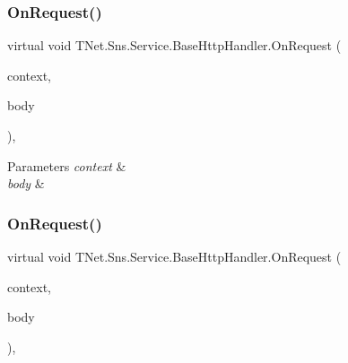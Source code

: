 \subsubsection{\texorpdfstring{On\+Request()}{OnRequest()}\hspace{0.1cm}{\footnotesize\ttfamily [1/2]}}
{\footnotesize\ttfamily virtual void T\+Net.\+Sns.\+Service.\+Base\+Http\+Handler.\+On\+Request (\begin{DoxyParamCaption}\item[{I\+Http\+Request\+Context}]{context,  }\item[{\mbox{\hyperlink{class_t_net_1_1_sns_1_1_service_1_1_response_body}{Response\+Body}}}]{body }\end{DoxyParamCaption})\hspace{0.3cm}{\ttfamily [protected]}, {\ttfamily [virtual]}}






\begin{DoxyParams}{Parameters}
{\em context} & \\
\hline
{\em body} & \\
\hline
\end{DoxyParams}
\mbox{\label{class_t_net_1_1_sns_1_1_service_1_1_base_http_handler_ad9df58a935f69c481e0b7e2e7b20900b}} 
\subsubsection{\texorpdfstring{On\+Request()}{OnRequest()}\hspace{0.1cm}{\footnotesize\ttfamily [2/2]}}
{\footnotesize\ttfamily virtual void T\+Net.\+Sns.\+Service.\+Base\+Http\+Handler.\+On\+Request (\begin{DoxyParamCaption}\item[{Http\+Context}]{context,  }\item[{\mbox{\hyperlink{class_t_net_1_1_sns_1_1_service_1_1_response_body}{Response\+Body}}}]{body }\end{DoxyParamCaption})\hspace{0.3cm}{\ttfamily [protected]}, {\ttfamily [virtual]}}






